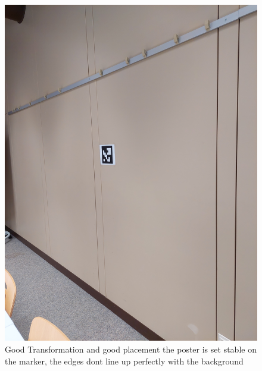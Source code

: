 \documentclass[a4paper,twocolumn]{article}
\begin{document}
    \begin{figure}[htbp]
    \centering
    \includegraphics[width=0.9\columnwidth]{img/20221115_113424.jpg} %
    \caption{Good Transformation and good placement the poster is set stable on the marker, the edges dont line up perfectly with the background}
    \label{fig:20221115_113424.jpg}
    \end{figure}
    
\end{document}
